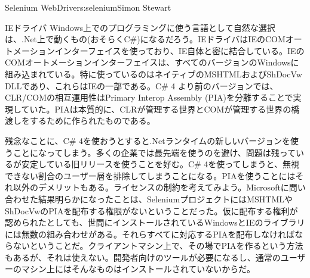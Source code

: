 \begin{aosachapter}{Selenium WebDriver}{s:selenium}{Simon Stewart}
\begin{aosasect1}{IEドライバ}
Windows上でのプログラミングに使う言語として自然な選択は、.Net上で動くもの(おそらくC\#)になるだろう。IEドライバはIEのCOMオートメーションインターフェイスを使っており、IE自体と密に結合している。IEのCOMオートメーションインターフェイスは、すべてのバージョンのWindowsに組み込まれている。特に使っているのはネイティブのMSHTMLおよびShDocVw DLLであり、これらはIEの一部である。C\# 4 より前のバージョンでは、CLR/COMの相互運用性はPrimary Interop Assembly (PIA)を分離することで実現していた。PIAは本質的に、CLRが管理する世界とCOMが管理する世界の橋渡しをするために作られたものである。

残念なことに、C\# 4を使おうとすると.Netランタイムの新しいバージョンを使うことになってしまう。多くの企業では最先端を使うのを避け、問題は残っているが安定している旧リリースを使うことを好む。C\# 4を使ってしまうと、無視できない割合のユーザー層を排除してしまうことになる。PIAを使うことにはそれ以外のデメリットもある。ライセンスの制約を考えてみよう。Microsoftに問い合わせた結果明らかになったことは、SeleniumプロジェクトにはMSHTMLやShDocVwのPIAを配布する権限がないということだった。仮に配布する権利が認められたとしても、世間にインストールされているWindowsとIEのライブラリには無数の組み合わせがある。それらすべてに対応するPIAを配布しなければならないということだ。クライアントマシン上で、その場でPIAを作るという方法もあるが、それは使えない。開発者向けのツールが必要になるし、通常のユーザーのマシン上にはそんなものはインストールされていないからだ。


\end{aosasect1}
\end{aosachapter}

